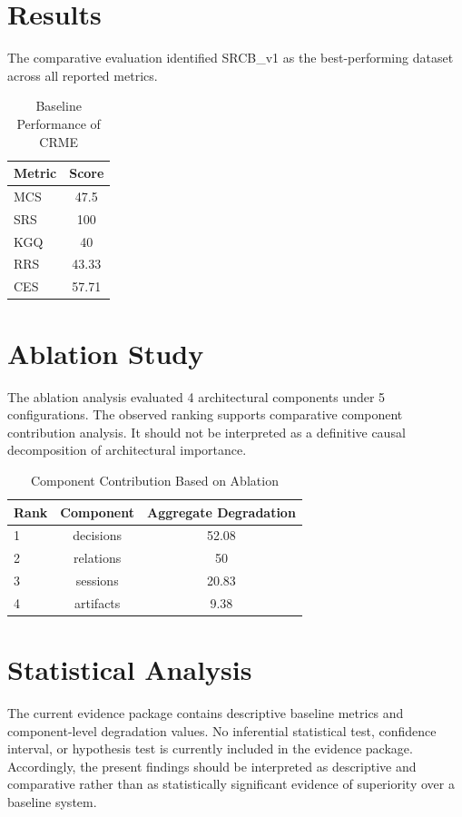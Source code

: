 \documentclass[11pt]{article}
\begin{document}
\section{Results}
The comparative evaluation identified SRCB\_v1 as the best-performing dataset across all reported metrics.
\begin{table}[htbp]
\centering
\caption{Baseline Performance of CRME}
\label{tab:crme-baseline-performance}
\begin{tabular}{lc}
\toprule
Metric & Score \\
\midrule
MCS & 47.5 \\
SRS & 100 \\
KGQ & 40 \\
RRS & 43.33 \\
CES & 57.71 \\
\bottomrule
\end{tabular}
\end{table}

\section{Ablation Study}
The ablation analysis evaluated 4 architectural components under 5 configurations.
The observed ranking supports comparative component contribution analysis. It should not be interpreted as a definitive causal decomposition of architectural importance.
\begin{table}[htbp]
\centering
\caption{Component Contribution Based on Ablation}
\label{tab:crme-ablation-ranking}
\begin{tabular}{lcc}
\toprule
Rank & Component & Aggregate Degradation \\
\midrule
1 & decisions & 52.08 \\
2 & relations & 50 \\
3 & sessions & 20.83 \\
4 & artifacts & 9.38 \\
\bottomrule
\end{tabular}
\end{table}

\section{Statistical Analysis}
The current evidence package contains descriptive baseline metrics and component-level degradation values.
No inferential statistical test, confidence interval, or hypothesis test is currently included in the evidence package.
Accordingly, the present findings should be interpreted as descriptive and comparative rather than as statistically significant evidence of superiority over a baseline system.
\end{document}

